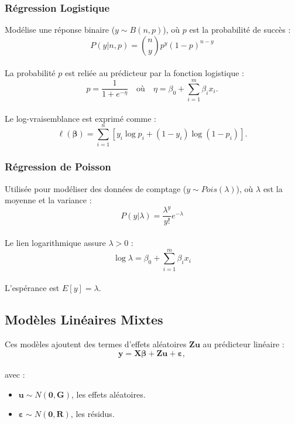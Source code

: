 \documentclass[
]{article}
\begin{document}
\hypertarget{ruxe9gression-logistique}{%
\subsubsection{Régression Logistique}\label{ruxe9gression-logistique}}

Modélise une réponse binaire (\(y \sim B(n, p)\)), où \(p\) est la
probabilité de succès :\\
\[ P(y | n, p) = \binom{n}{y} p^y (1-p)^{n-y} \]\\
La probabilité \(p\) est reliée au prédicteur par la fonction logistique
:\\
\[ p = \frac{1}{1 + e^{-\eta}} \quad \text{où} \quad \eta = \beta_0 + \sum_{i=1}^m \beta_i x_i. \]\\
Le log-vraisemblance est exprimé comme :\\
\[ \ell(\boldsymbol{\beta}) = \sum_{i=1}^n \left[ y_i \log{p_i} + (1-y_i) \log{(1-p_i)} \right]. \]

\hypertarget{ruxe9gression-de-poisson}{%
\subsubsection{Régression de Poisson}\label{ruxe9gression-de-poisson}}

Utilisée pour modéliser des données de comptage
(\(y \sim Pois(\lambda)\)), où \(\lambda\) est la moyenne et la variance
:\\
\[ P(y | \lambda) = \frac{\lambda^y}{y!} e^{-\lambda} \]\\
Le lien logarithmique assure \(\lambda > 0\) :\\
\[ \log{\lambda} = \beta_0 + \sum_{i=1}^m \beta_i x_i \]\\
L'espérance est \(E[y] = \lambda\).

\hypertarget{moduxe8les-linuxe9aires-mixtes}{%
\subsection{Modèles Linéaires
Mixtes}\label{moduxe8les-linuxe9aires-mixtes}}

Ces modèles ajoutent des termes d'effets aléatoires
\(\mathbf{Z} \mathbf{u}\) au prédicteur linéaire :\\
\[ \mathbf{y} = \mathbf{X} \boldsymbol{\beta} + \mathbf{Z} \mathbf{u} + \boldsymbol{\varepsilon}, \]\\
avec :

\begin{itemize}
\item
  \(\mathbf{u} \sim N(\mathbf{0}, \mathbf{G})\), les effets aléatoires.
\item
  \(\boldsymbol{\varepsilon} \sim N(\mathbf{0}, \mathbf{R})\), les
  résidus.
\end{itemize}
\end{document}

